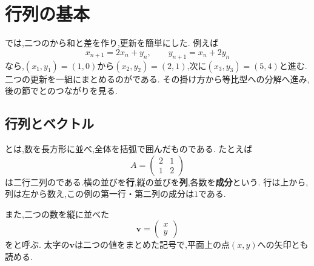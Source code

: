 
\section{行列の基本}\label{節：行列の基本}

では,二つのから和と差を作り,更新を簡単にした.
例えば
\[
  x_{n+1}=2x_n+y_n,\qquad y_{n+1}=x_n+2y_n
\]
なら,$(x_1,y_1)=(1,0)$から$(x_2,y_2)=(2,1)$,次に$(x_3,y_3)=(5,4)$と進む.
二つの更新を一組にまとめるのがである.
その掛け方から等比型への分解へ進み,後の節でとのつながりを見る.

\subsection{行列とベクトル}

とは,数を長方形に並べ,全体を括弧で囲んだものである.
たとえば
\[
  A=\begin{pmatrix}2&1\\1&2\end{pmatrix}
\]
は二行二列のである.横の並びを\textbf{行},縦の並びを\textbf{列},各数を\textbf{成分}という.
行は上から,列は左から数え,この例の第一行・第二列の成分は$1$である.

また,二つの数を縦に並べた
\[
  \boldsymbol{v}=\begin{pmatrix}x\\y\end{pmatrix}
\]
を\textbf{}と呼ぶ.
太字の$\boldsymbol{v}$は二つの値をまとめた記号で,平面上の点$(x,y)$への矢印とも読める.

